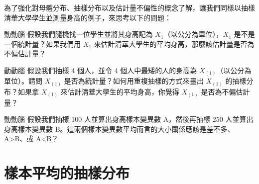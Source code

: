    為了強化對母體分布、抽樣分布以及估計量不偏性的概念了解，讓我們同樣以抽樣清華大學學生並測量身高的例子，來思考以下的問題：

    \pagebreak

    \begin{custom}{動動腦}
        假設我們隨機找一位學生並將其身高記為 $X_1$（以公分為單位），$X_1$ 是不是一個統計量？如果我們用 $X_1$ 來估計清華大學生的平均身高，那麼該估計量是否為不偏估計量？
    \end{custom}

    \answerbox{150pt}

    \bigskip

    \begin{custom}{動動腦}
        假設我們抽樣 4 個人，並令 4 個人中最矮的人的身高為 $X_{(1)}$（以公分為單位）。請問 $X_{(1)}$ 是否為統計量？如何用重複抽樣的方式來畫出 $X_{(1)}$ 的抽樣分布？如果拿 $X_{(1)}$ 來估計清華大學生的平均身高，你覺得 $X_{(1)}$ 是否為不偏估計量？
    \end{custom}

    \answerbox{180pt}

    \bigskip

    \begin{custom}{動動腦}
        假設我們抽樣 100 人並算出身高樣本變異數 A，然後再抽樣 250 人並算出身高樣本變異數 B。這兩個樣本變異數平均而言的大小關係應該是差不多、A>B、或 A<B？
    \end{custom}

    \answerbox{200pt}
    
\section{樣本平均的抽樣分布}

